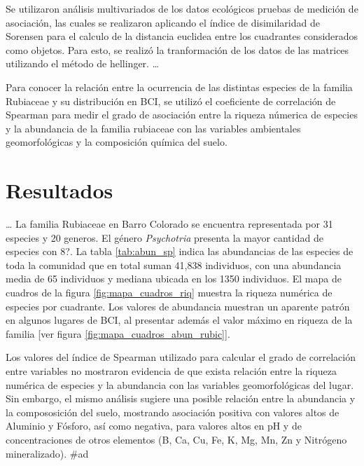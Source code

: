 \documentclass[11pt,]{article}
\begin{document}
Se utilizaron análisis multivariados de los datos ecológicos pruebas de
medición de asociación, las cuales se realizaron aplicando el índice de
disimilaridad de Sorensen para el calculo de la distancia euclidea entre
los cuadrantes considerados como objetos. Para esto, se realizó la
tranformación de los datos de las matrices utilizando el método de
hellinger. \dots

Para conocer la relación entre la ocurrencia de las distintas especies
de la familia Rubiaceae y su distribución en BCI, se utilizó el
coeficiente de correlación de Spearman para medir el grado de asociación
entre la riqueza númerica de especies y la abundancia de la familia
rubiaceae con las variables ambientales geomorfológicas y la composición
química del suelo.

\section{Resultados}\label{resultados}

\dots
La familia Rubiaceae en Barro Colorado se encuentra representada por 31
especies y 20 generos. El género \emph{Psychotria} presenta la mayor
cantidad de especies con 8?. La tabla \ref{tab:abun_sp} indica las
abundancias de las especies de toda la comunidad que en total suman
41,838 individuos, con una abundancia media de 65 individuos y mediana
ubicada en los 1350 individuos. El mapa de cuadros de la figura
\ref{fig:mapa_cuadros_riq} muestra la riqueza numérica de especies por
cuadrante. Los valores de abundancia muestran un aparente patrón en
algunos lugares de BCI, al presentar además el valor máximo en riqueza
de la familia {[}ver figura \ref{fig:mapa_cuadros_abun_rubic}{]}.

Los valores del índice de Spearman utilizado para calcular el grado de
correlación entre variables no mostraron evidencia de que exista
relación entre la riqueza numérica de especies y la abundancia con las
variables geomorfológicas del lugar. Sin embargo, el mismo análisis
sugiere una posible relación entre la abundancia y la compososición del
suelo, mostrando asociación positiva con valores altos de Aluminio y
Fósforo, así como negativa, para valores altos en pH y de
concentraciones de otros elementos (B, Ca, Cu, Fe, K, Mg, Mn, Zn y
Nitrógeno mineralizado). \#ad
\end{document}
